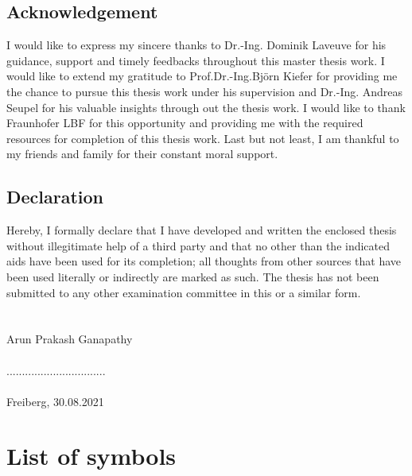\documentclass[12pt,a4paper,twoside,openright]{report}
\begin{document}
\section*{\LARGE{Acknowledgement} }
\vspace*{1cm}
\indent\indent\indent   I would like to express my sincere thanks to Dr.-Ing. Dominik Laveuve for his guidance, support and timely feedbacks throughout this master thesis work.  I would like to extend my gratitude to Prof.Dr.-Ing.Björn Kiefer for providing me the chance to pursue this thesis work under his supervision and Dr.-Ing. Andreas Seupel for his valuable insights through out the thesis work.  I would like to thank Fraunhofer LBF for this opportunity and providing me with the required resources for completion of this thesis work. Last but not least, I am thankful to my friends and family for their constant moral support.



\clearpage
\thispagestyle{empty}
\hfill
\clearpage
\vspace*{2cm}
\section*{\LARGE{Declaration} }
\vspace*{1cm}
\indent\indent\indent Hereby, I  formally declare that I  have developed and written the enclosed thesis 
without illegitimate help of a third party and that no other than the indicated aids have been used for its completion; all thoughts from other sources that have been used literally or indirectly are marked as such. The thesis has not been submitted to any other examination committee in this or a similar form.\\\\\\ Arun Prakash Ganapathy  \\\\ ................................  \\\\ Freiberg, 30.08.2021





\tableofcontents
\listoffigures
\listoftables


\chapter*{List of symbols}
\end{document}
